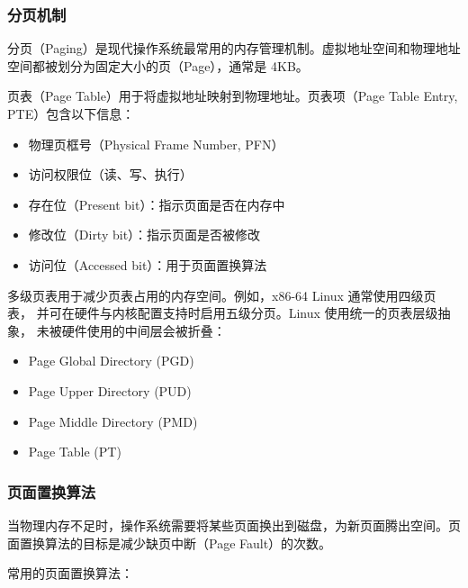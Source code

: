 \subsubsection{分页机制}

分页（Paging）是现代操作系统最常用的内存管理机制。虚拟地址空间和物理地址空间都被划分为固定大小的页（Page），通常是 4KB。

页表（Page Table）用于将虚拟地址映射到物理地址。页表项（Page Table Entry, PTE）包含以下信息：
\begin{itemize}
  \item 物理页框号（Physical Frame Number, PFN）
  \item 访问权限位（读、写、执行）
  \item 存在位（Present bit）：指示页面是否在内存中
  \item 修改位（Dirty bit）：指示页面是否被修改
  \item 访问位（Accessed bit）：用于页面置换算法
\end{itemize}

多级页表用于减少页表占用的内存空间。例如，x86-64 Linux 通常使用四级页表，
并可在硬件与内核配置支持时启用五级分页。Linux 使用统一的页表层级抽象，
未被硬件使用的中间层会被折叠：
\begin{itemize}
  \item Page Global Directory (PGD)
  \item Page Upper Directory (PUD)
  \item Page Middle Directory (PMD)
  \item Page Table (PT)
\end{itemize}

\subsubsection{页面置换算法}

当物理内存不足时，操作系统需要将某些页面换出到磁盘，为新页面腾出空间。页面置换算法的目标是减少缺页中断（Page Fault）的次数。

常用的页面置换算法：

